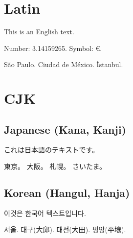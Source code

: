 \documentclass[a4paper]{ujarticle}
\begin{document}
\thispagestyle{empty}
\section{Latin}
This is an English text.


Number: 3.14159265.
Symbol: €.

São Paulo.
Ciudad de México.
İstanbul.

\section{CJK}
\subsection{Japanese (Kana, Kanji)}
これは日本語のテキストです。


東京。
大阪。
札幌。
さいたま。

\subsection{Korean (Hangul, Hanja)}
\begin{otherlanguage}{korean}
이것은 한국어 텍스트입니다.

서울.
대구(大邱).
대전(大田).
평양(平壤).
\end{otherlanguage}
\end{document}
